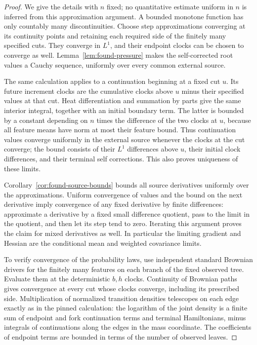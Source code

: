 \begin{proof}
We give the details with $n$ fixed; no quantitative estimate uniform in
$n$ is inferred from this approximation argument. A bounded monotone
function has only countably many discontinuities. Choose step
approximations converging at its continuity points and retaining each
required side of the finitely many specified cuts. They converge in
$L^1$, and their endpoint clocks can be chosen to converge as well.
Lemma~\ref{lem:found-pressure} makes the self-corrected root values a
Cauchy sequence, uniformly over every common external source.

The same calculation applies to a continuation beginning at a fixed
cut $u$. Its future increment clocks are the cumulative clocks above
$u$ minus their specified values at that cut. Heat differentiation and
summation by parts give the same interior integral, together with an
initial boundary term. The latter is bounded by a constant depending
on $n$ times the difference of the two clocks at $u$, because all
feature means have norm at most their feature bound. Thus continuation
values converge uniformly in the external source whenever the clocks
at the cut converge; the bound consists of their $L^1$ differences
above $u$, their initial clock differences, and their terminal self
corrections. This also proves uniqueness of these limits.

Corollary~\ref{cor:found-source-bounds} bounds all source derivatives
uniformly over the approximations. Uniform convergence of values and
the bound on the next derivative imply convergence of any fixed
derivative by finite differences: approximate a derivative by a fixed
small difference quotient, pass to the limit in the quotient, and then
let its step tend to zero. Iterating this argument proves the claim
for mixed derivatives as well. In particular the limiting gradient and
Hessian are the conditional mean and weighted covariance limits.

To verify convergence of the probability laws, use independent standard
Brownian drivers for the finitely many features on each branch of the
fixed observed tree. Evaluate them at the deterministic $b,h$ clocks.
Continuity of Brownian paths gives convergence at every cut whose clocks
converge, including its prescribed side. Multiplication of normalized
transition densities telescopes on each edge exactly as in the pinned
calculation: the logarithm of the joint density is a finite sum of
endpoint and fork continuation terms and terminal Hamiltonians, minus
integrals of continuations along the edges in the mass coordinate.
The coefficients of endpoint terms are bounded in terms of the number
of observed leaves.


\end{proof}
